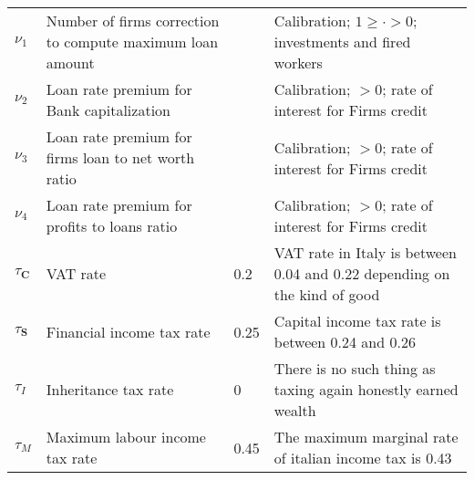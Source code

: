 \documentclass[a4paper, headings=standardclasses]{scrartcl}
\begin{document}
\begin{xltabular}{\linewidth}{lXlX}
    $\nu_1$                      & Number of firms correction to compute maximum loan amount    &       & Calibration; $1 \ge \cdot > 0$; investments and fired workers                                                                                                                                                             \\
    $\nu_2$                      & Loan rate premium for Bank capitalization                    &       & Calibration; $>0$; rate of interest for Firms credit                                                                                                                                                             \\
    $\nu_3$                      & Loan rate premium for firms loan to net worth ratio          &       & Calibration; $>0$; rate of interest for Firms credit                                                                                                                                                            \\
    $\nu_4$                      & Loan rate premium for profits to loans ratio                 &       & Calibration; $>0$; rate of interest for Firms credit                                                                                                                                                            \\
    $\tau_\mathbf{C}$            & VAT rate                                                     & 0.2   & VAT rate in Italy is between 0.04 and 0.22 depending on the kind of good                                                                                                                                                            \\
    $\tau_\mathbf{S}$            & Financial income tax rate                                    & 0.25  & Capital income tax rate is between 0.24 and 0.26                                                                                                                                                            \\
    $\tau_I$                     & Inheritance tax rate                                         & 0     & There is no such thing as taxing again honestly earned wealth                                                                                                                                                            \\
    $\tau_M$                     & Maximum labour income tax rate                               & 0.45   &  The maximum marginal rate of italian income tax is 0.43                                                   \\

\end{xltabular}
\end{document}
